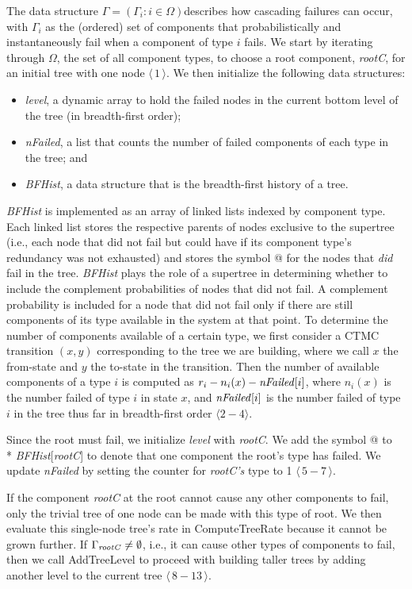 \documentclass[12pt]{article}
\newcommand{\varName}[1]{\textrm{\it#1}}
\newcommand{\citeLine}[1]{$\langle\,#1\,\rangle$}
\newcommand{\citeBlock}[2]{$\langle\,#1 - #2\,\rangle$}
\begin{document}
The data structure $\Gamma = (\Gamma_i : i \in \Omega)$describes how cascading failures can occur, with $\Gamma_i$ as the (ordered) set of components that probabilistically and instantaneously fail when a component of type $i$ fails. We start by iterating through $\Omega$, the set of all component types, to choose a root component, \varName{rootC}, for an initial tree with one node \citeLine{1}. We then initialize the following data structures:\begin{itemize} \item \varName{level}, a dynamic array to hold the failed nodes in the current bottom level of the tree (in breadth-first order); \item \varName{nFailed}, a list that counts the number of failed components of each type in the tree; and \item \varName{BFHist}, a data structure that is the breadth-first history of a tree. \end{itemize} \varName{BFHist} is implemented as an array of linked lists indexed by component type. Each linked list stores the respective parents of nodes exclusive to the supertree (i.e., each node that did not fail but could have if its component type's redundancy was not exhausted) and stores the symbol @ for the nodes that \varName{did} fail in the tree. \varName{BFHist} plays the role of a supertree in determining whether to include the complement probabilities of nodes that did not fail. A complement probability is included for a node that did not fail only if there are still components of its type available in the system at that point. To determine the number of components available of a certain type, we first consider a CTMC transition $(x,y)$ corresponding to the tree we are building, where we call $x$ the from-state and $y$ the to-state in the transition. Then the number of available components of a type $i$ is computed as $r_i - n_i(x) - \mbox{\textit{nFailed}}[i]$, where $n_i(x)$ is the number failed of type $i$ in state $x$, and $\mbox{\textit{nFailed}}[i]$ is the number failed of type $i$ in the tree thus far in breadth-first order $\langle 2-4 \rangle$.

Since the root must fail, we initialize \varName{level} with \varName{rootC}. We add the symbol @ to \\* \varName{BFHist}[\varName{rootC}] to denote that one component the root's type has failed. We update \varName{nFailed} by setting the counter for \varName{rootC's} type to 1 \citeBlock{5}{7}.

If the component \varName{rootC} at the root cannot cause any other components to fail, only the trivial tree of one node can be made with this type of root. We then evaluate this single-node tree's rate in ComputeTreeRate because it cannot be grown further. If $\Gamma_{\textrm{\varName{rootC}}} \neq \emptyset$, i.e., it can cause other types of components to fail, then we call AddTreeLevel to proceed with building taller trees by adding another level to the current tree \citeBlock{8}{13}.
\end{document}
